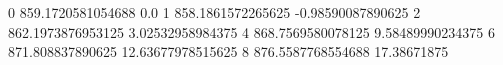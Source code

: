 0 859.1720581054688 0.0
1 858.1861572265625 -0.98590087890625
2 862.1973876953125 3.02532958984375
4 868.7569580078125 9.58489990234375
6 871.808837890625 12.63677978515625
8 876.5587768554688 17.38671875
